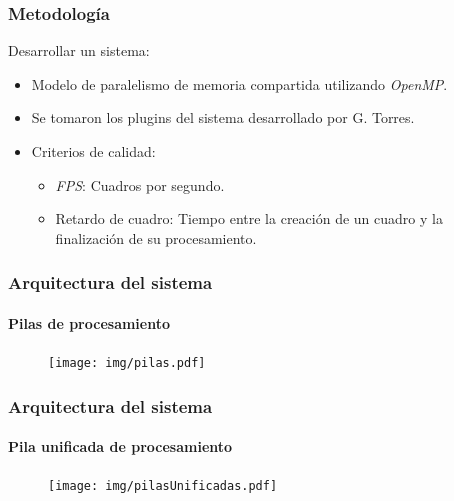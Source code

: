 \documentclass[11pt,a4paper,spanish]{beamer}
\begin{document}
\begin{frame}

\frametitle{Metodología}

Desarrollar un sistema:

\begin{itemize}

	\item Modelo de paralelismo de memoria compartida utilizando
		\emph{OpenMP}.
	
	\item Se tomaron los plugins del sistema desarrollado por G. Torres.

	\item Criterios de calidad:

\begin{itemize}

	\item \emph{FPS}: Cuadros por segundo.

	\item Retardo de cuadro: Tiempo entre la creación de un cuadro y la
		finalización de su procesamiento.

\end{itemize}

\end{itemize}

\end{frame}

\begin{frame}

\frametitle{Arquitectura del sistema}

\framesubtitle{Pilas de procesamiento}

\begin{figure}[h]

	\centering

	\texttt{[image: img/pilas.pdf]}

\end{figure}

\end{frame}

\begin{frame}

\frametitle{Arquitectura del sistema}

\framesubtitle{Pila unificada de procesamiento}

\begin{figure}[h]

	\centering

	\texttt{[image: img/pilasUnificadas.pdf]}

\end{figure}

\end{frame}
\end{document}
